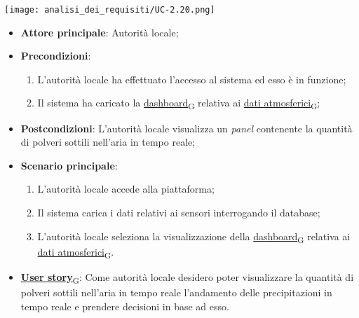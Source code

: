 \begin{center}
	\texttt{[image: analisi\_dei\_requisiti/UC-2.20.png]}
\end{center}

\begin{itemize}
	\item \textbf{Attore principale}: Autorità locale;
	\item \textbf{Precondizioni}:
	      \begin{enumerate}
		      \item L'autorità locale ha effettuato l'accesso al sistema ed esso è in funzione;
		      \item Il sistema ha caricato la \href{https://7last.github.io/docs/rtb/documentazione-interna/glossario\#dashboard}{dashboard\textsubscript{G}} relativa ai \href{https://7last.github.io/docs/rtb/documentazione-interna/glossario\#dati-atmosferici}{dati atmosferici\textsubscript{G}};
	      \end{enumerate}
	\item \textbf{Postcondizioni}: L'autorità locale visualizza un \textit{panel} contenente la quantità di polveri sottili nell'aria in tempo reale;
	\item \textbf{Scenario principale}:
	      \begin{enumerate}
		      \item L'autorità locale accede alla piattaforma;
		      \item Il sistema carica i dati relativi ai sensori interrogando il database;
		      \item L'autorità locale seleziona la visualizzazione della \href{https://7last.github.io/docs/rtb/documentazione-interna/glossario\#dashboard}{dashboard\textsubscript{G}} relativa ai \href{https://7last.github.io/docs/rtb/documentazione-interna/glossario\#dati-atmosferici}{dati atmosferici\textsubscript{G}}.
	      \end{enumerate}
	\item \href{https://7last.github.io/docs/rtb/documentazione-interna/glossario\#user-story}{\textbf{User story}\textsubscript{G}}: Come autorità locale desidero poter visualizzare la quantità di polveri sottili nell'aria in tempo reale
	      l'andamento delle precipitazioni in tempo reale e prendere decisioni in base ad esso.
\end{itemize}

